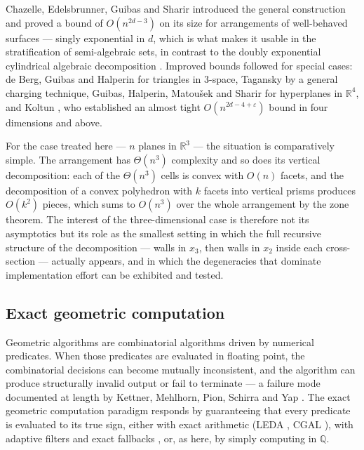 \documentclass[11pt]{article}
\newcommand{\R}{\mathbb{R}}
\begin{document}
Chazelle, Edelsbrunner, Guibas and Sharir \cite{chazelle-stratification}
introduced the general construction and proved a bound of $O(n^{2d-3})$ on its
size for arrangements of well-behaved surfaces --- singly exponential in $d$,
which is what makes it usable in the stratification of semi-algebraic sets, in
contrast to the doubly exponential cylindrical algebraic decomposition
\cite{collins-cad,schwartz-sharir}.  Improved bounds followed for special
cases: de Berg, Guibas and Halperin \cite{deberg-guibas-halperin} for triangles
in $3$-space, Tagansky \cite{tagansky} by a general charging technique, Guibas,
Halperin, Matou\v{s}ek and Sharir \cite{guibas-halperin-matousek-sharir} for
hyperplanes in $\R^4$, and Koltun \cite{koltun}, who established an almost
tight $O(n^{2d-4+\varepsilon})$ bound in four dimensions and above.

For the case treated here --- $n$ planes in $\R^3$ --- the situation is
comparatively simple.  The arrangement has $\Theta(n^3)$ complexity and so does
its vertical decomposition: each of the $\Theta(n^3)$ cells is convex with
$O(n)$ facets, and the decomposition of a convex polyhedron with $k$ facets
into vertical prisms produces $O(k^2)$ pieces, which sums to $O(n^3)$ over the
whole arrangement by the zone theorem.  The interest of the three-dimensional
case is therefore not its asymptotics but its role as the smallest setting in
which the full recursive structure of the decomposition --- walls in $x_3$,
then walls in $x_2$ inside each cross-section --- actually appears, and in which
the degeneracies that dominate implementation effort can be exhibited and
tested.

\subsection{Exact geometric computation}

Geometric algorithms are combinatorial algorithms driven by numerical
predicates.  When those predicates are evaluated in floating point, the
combinatorial decisions can become mutually inconsistent, and the algorithm can
produce structurally invalid output or fail to terminate --- a failure mode
documented at length by Kettner, Mehlhorn, Pion, Schirra and Yap
\cite{kettner-classroom}.  The exact geometric computation paradigm
\cite{yap-egc} responds by guaranteeing that every predicate is evaluated to
its true sign, either with exact arithmetic (LEDA \cite{leda}, CGAL
\cite{cgal}), with adaptive filters and exact fallbacks
\cite{fortune-vanwyk,shewchuk-predicates}, or, as here, by simply computing in
$\mathbb{Q}$.
\end{document}
